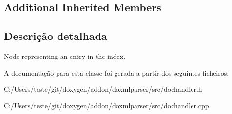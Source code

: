 \subsection*{Additional Inherited Members}


\subsection{Descrição detalhada}
Node representing an entry in the index. 



A documentação para esta classe foi gerada a partir dos seguintes ficheiros\-:\begin{DoxyCompactItemize}
\item 
C\-:/\-Users/teste/git/doxygen/addon/doxmlparser/src/dochandler.\-h\item 
C\-:/\-Users/teste/git/doxygen/addon/doxmlparser/src/dochandler.\-cpp\end{DoxyCompactItemize}
